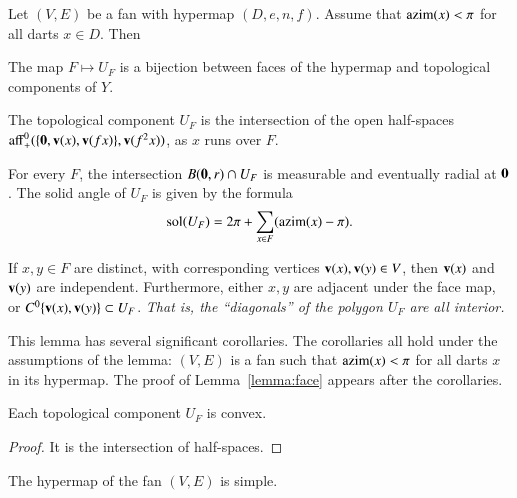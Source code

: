 \begin{lemma}\label{lemma:face}
Let $(V,E)$ be a fan with hypermap $(D,e,n,f)$. 
Assume that ${\operatorname{azim}}(x)<\pi$
for all darts $x\in D$.  Then
\begin{nomerate}
\item {} The map $F\mapsto U_F$ is a bijection between faces of the hypermap
and topological components of $Y$.
\item {} The topological component $U_F$ is the intersection of the open
half-spaces ${\operatorname{aff}}_+^0(\{{\mathbf 0},{\mathbf v}(x),{\mathbf v}({f x})\},{\mathbf v}(f^2 x))$, as $x$ runs
over $F$.
\item {} For every $F$, the intersection $B({\mathbf 0},r)\cap U_F$ is measurable and
eventually radial at ${\mathbf 0}$.  The solid angle of $U_F$ is given by the
formula
$$
\operatorname{sol}(U_F) = 2\pi + \sum_{x\in F}({\operatorname{azim}}(x)-\pi).
$$
\item {}  If $x,y\in F$ are distinct, with corresponding vertices ${\mathbf v}(x),{\mathbf v}(y)\in V$, then
${\mathbf v}(x)$ and ${\mathbf v}(y)$ are independent.
Furthermore, 
either $x,y$ are adjacent under the face map, or $C^0\{{\mathbf v}(x),{\mathbf v}(y)\}\subset U_F$.  {\it That is, the ``diagonals'' of the polygon $U_F$ are all interior.}
\end{nomerate}
\end{lemma}

This lemma has several significant corollaries.  The corollaries all hold under the assumptions of the lemma: $(V,E)$ is a fan such that ${\operatorname{azim}}(x)<\pi$ for all darts $x$ in its hypermap.  The proof of Lemma~\ref{lemma:face} appears after the corollaries.

\begin{corollary}
Each topological component $U_F$ is convex.
\end{corollary}
%
%

\begin{proof} It is the intersection of half-spaces.
\end{proof}

\begin{corollary}  
The hypermap of the fan $(V,E)$ is simple.
\end{corollary}
%

